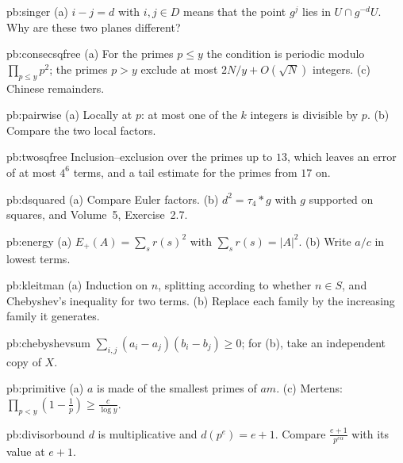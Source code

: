 \begin{hint}{pb:singer}
(a) $i-j=d$ with $i,j\in D$ means that the point $g^j$ lies in $U\cap g^{-d}U$. Why are these two planes different?
\end{hint}

\begin{hint}{pb:consecsqfree}
(a) For the primes $p\le y$ the condition is periodic modulo $\prod_{p\le y}p^2$; the primes $p>y$ exclude at most $2N/y+O(\sqrt N)$
integers. (c) Chinese remainders.
\end{hint}

\begin{hint}{pb:pairwise}
(a) Locally at $p$: at most one of the $k$ integers is divisible by $p$. (b) Compare the two local factors.
\end{hint}

\begin{hint}{pb:twosqfree}
Inclusion--exclusion over the primes up to $13$, which leaves an error of at most $4^6$ terms, and a tail estimate for the
primes from $17$ on.
\end{hint}

\begin{hint}{pb:dsquared}
(a) Compare Euler factors. (b) $d^2=\tau_4*g$ with $g$ supported on squares, and Volume~5, Exercise~2.7.
\end{hint}

\begin{hint}{pb:energy}
(a) $E_+(A)=\sum_sr(s)^2$ with $\sum_sr(s)=|A|^2$. (b) Write $a/c$ in lowest terms.
\end{hint}

\begin{hint}{pb:kleitman}
(a) Induction on $n$, splitting according to whether $n\in S$, and Chebyshev's inequality for two terms. (b) Replace each family by
the increasing family it generates.
\end{hint}

\begin{hint}{pb:chebyshevsum}
$\sum_{i,j}(a_i-a_j)(b_i-b_j)\ge0$; for (b), take an independent copy of $X$.
\end{hint}

\begin{hint}{pb:primitive}
(a) $a$ is made of the smallest primes of $am$. (c) Mertens: $\prod_{p<y}(1-\frac1p)\ge\frac c{\log y}$.
\end{hint}

\begin{hint}{pb:divisorbound}
$d$ is multiplicative and $d(p^e)=e+1$. Compare $\frac{e+1}{p^{e\alpha}}$ with its value at $e+1$.
\end{hint}

